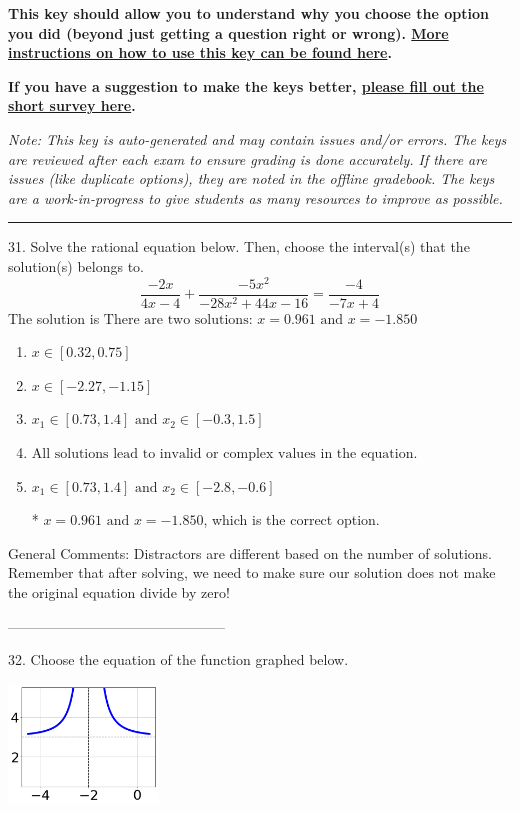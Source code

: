 \documentclass{extbook}[14pt]
\begin{document}
\textbf{This key should allow you to understand why you choose the option you did (beyond just getting a question right or wrong). \href{https://xronos.clas.ufl.edu/mac1105spring2020/courseDescriptionAndMisc/Exams/LearningFromResults}{More instructions on how to use this key can be found here}.}

\textbf{If you have a suggestion to make the keys better, \href{https://forms.gle/CZkbZmPbC9XALEE88}{please fill out the short survey here}.}

\textit{Note: This key is auto-generated and may contain issues and/or errors. The keys are reviewed after each exam to ensure grading is done accurately. If there are issues (like duplicate options), they are noted in the offline gradebook. The keys are a work-in-progress to give students as many resources to improve as possible.}

\rule{\textwidth}{0.4pt}

31. Solve the rational equation below. Then, choose the interval(s) that the solution(s) belongs to.
\[ \frac{-2x}{4x -4} + \frac{-5x^{2}}{-28x^{2} +44 x -16} = \frac{-4}{-7x + 4} \] 
The solution is $ \text{There are two solutions: } x = 0.961 \text{ and } x = -1.850 $ 

\begin{enumerate}[label=\Alph*.] 
\item $ x \in [0.32,0.75] $ 

  
\item $ x \in [-2.27,-1.15] $ 

  
\item $ x_1 \in [0.73, 1.4] \text{ and } x_2 \in [-0.3,1.5] $ 

  
\item $ \text{All solutions lead to invalid or complex values in the equation.} $ 

  
\item $ x_1 \in [0.73, 1.4] \text{ and } x_2 \in [-2.8,-0.6] $ 

 * $x = 0.961 \text{ and } x = -1.850$, which is the correct option. 
\end{enumerate} 
 
General Comments: Distractors are different based on the number of solutions. Remember that after solving, we need to make sure our solution does not make the original equation divide by zero!

-----------------------------------------------

32. Choose the equation of the function graphed below.
\begin{center} \includegraphics[width=0.3\textwidth]{../Figures/rationalGraphToEquationB.png} \end{center} 
\end{document}
